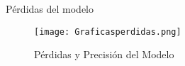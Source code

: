 \begin{frame}{Pérdidas del modelo}
    
    \begin{figure}[H]
        \begin{center}
          \texttt{[image: Graficasperdidas.png]}
          \caption{Pérdidas y Precisión del Modelo}
          \label{Alexis13}
        \end{center}
    \end{figure}
     
\end{frame}


